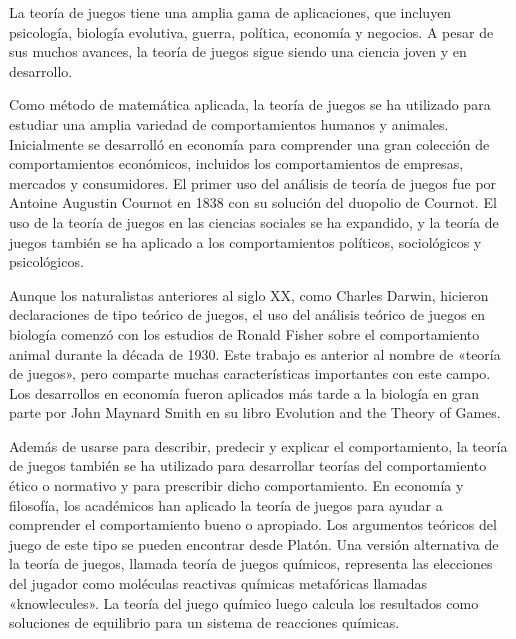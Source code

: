 La teoría de juegos tiene una amplia gama de aplicaciones, que incluyen psicología, biología evolutiva, guerra, política, economía y negocios. A pesar de sus muchos avances, la teoría de juegos sigue siendo una ciencia joven y en desarrollo.

Como método de matemática aplicada, la teoría de juegos se ha utilizado para estudiar una amplia variedad de comportamientos humanos y animales. Inicialmente se desarrolló en economía para comprender una gran colección de comportamientos económicos, incluidos los comportamientos de empresas, mercados y consumidores. El primer uso del análisis de teoría de juegos fue por Antoine Augustin Cournot en 1838 con su solución del duopolio de Cournot. El uso de la teoría de juegos en las ciencias sociales se ha expandido, y la teoría de juegos también se ha aplicado a los comportamientos políticos, sociológicos y psicológicos.

Aunque los naturalistas anteriores al siglo XX, como Charles Darwin, hicieron declaraciones de tipo teórico de juegos, el uso del análisis teórico de juegos en biología comenzó con los estudios de Ronald Fisher sobre el comportamiento animal durante la década de 1930. Este trabajo es anterior al nombre de «teoría de juegos», pero comparte muchas características importantes con este campo. Los desarrollos en economía fueron aplicados más tarde a la biología en gran parte por John Maynard Smith en su libro Evolution and the Theory of Games.

Además de usarse para describir, predecir y explicar el comportamiento, la teoría de juegos también se ha utilizado para desarrollar teorías del comportamiento ético o normativo y para prescribir dicho comportamiento. En economía y filosofía, los académicos han aplicado la teoría de juegos para ayudar a comprender el comportamiento bueno o apropiado. Los argumentos teóricos del juego de este tipo se pueden encontrar desde Platón. Una versión alternativa de la teoría de juegos, llamada teoría de juegos químicos, representa las elecciones del jugador como moléculas reactivas químicas metafóricas llamadas «knowlecules». La teoría del juego químico luego calcula los resultados como soluciones de equilibrio para un sistema de reacciones químicas.
